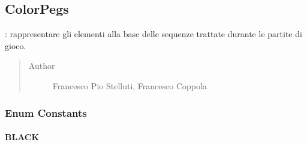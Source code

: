 \documentclass[letterpaper,10pt,italian,openany,oneside]{sphinxmanual}
\begin{document}
\subsection{ColorPegs}
\label{\detokenize{source/it/unicam/cs/pa/mastermind/gamecore/ColorPegs:colorpegs}}\label{\detokenize{source/it/unicam/cs/pa/mastermind/gamecore/ColorPegs::doc}}

\begin{fulllineitems}
\label{\detokenize{source/it/unicam/cs/pa/mastermind/gamecore/ColorPegs:it.unicam.cs.pa.mastermind.gamecore.ColorPegs}}
: rappresentare gli elementi alla base delle sequenze trattate durante le partite di gioco.
\begin{quote}\begin{description}
\item[{Author}] \leavevmode
Francesco Pio Stelluti, Francesco Coppola

\end{description}\end{quote}

\end{fulllineitems}



\subsubsection{Enum Constants}
\label{\detokenize{source/it/unicam/cs/pa/mastermind/gamecore/ColorPegs:enum-constants}}

\paragraph{BLACK}
\label{\detokenize{source/it/unicam/cs/pa/mastermind/gamecore/ColorPegs:black}}

\begin{fulllineitems}
\label{\detokenize{source/it/unicam/cs/pa/mastermind/gamecore/ColorPegs:it.unicam.cs.pa.mastermind.gamecore.ColorPegs.BLACK}}
\end{fulllineitems}
\end{document}
